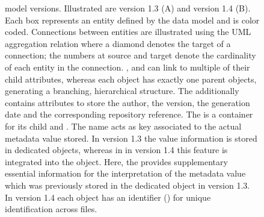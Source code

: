\begin{figure}[hp]
    \centering
    \scalebox{1}{
    }
    \caption[ model versions]{ model versions. Illustrated are  version 1.3 (A) and version 1.4 (B). Each box represents an entity defined by the data model and is color coded. Connections between entities are illustrated using the UML aggregation relation where a diamond denotes the target of a connection; the numbers at source and target denote the cardinality of each entity in the connection. ,  and  can link to multiple of their child attributes, whereas each object has exactly one parent objects, generating a branching, hierarchical structure. The  additionally contains attributes to store the author, the version, the generation date and the corresponding repository reference. The  is a container for its child  and . The  name acts as key associated to the actual metadata value stored. In  version 1.3 the value information is stored in dedicated  objects, whereas in in  version 1.4 this feature is integrated into the  object. Here, the  provides supplementary essential information for the interpretation of the metadata value which was previously stored in the dedicated  object in  version 1.3. In  version 1.4 each object has an identifier () for unique identification across files.}
    \label{fig:intro_odML_model}
\end{figure}


